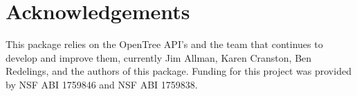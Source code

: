 \documentclass[oupdraft]{sysbio_sse}
\begin{document}
\section{Acknowledgements}
This package relies on the OpenTree API's and the team that continues to develop and improve them, currently Jim Allman, Karen Cranston, Ben Redelings, and the authors of this package. Funding for this project was provided by NSF ABI 1759846 and NSF ABI 1759838.


\bigskip\bigskip










\end{document}
